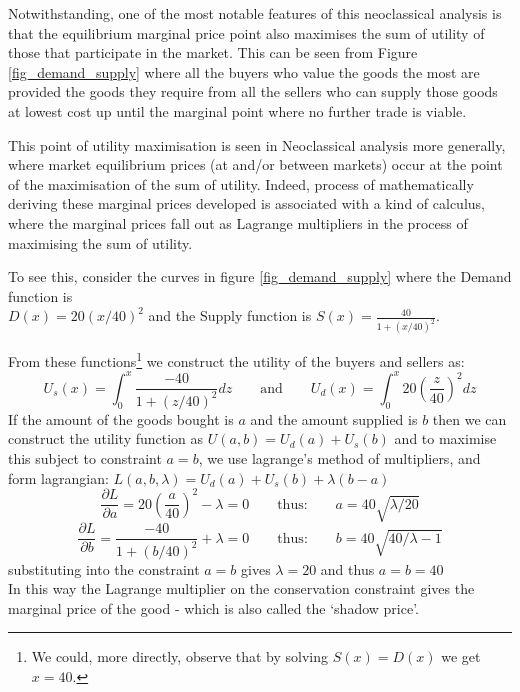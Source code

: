 

Notwithstanding, one of the most notable features of this neoclassical analysis is that the equilibrium marginal price point also maximises the sum of utility of those that participate in the market.
This can be seen from Figure \ref{fig_demand_supply} where all the buyers who value the goods the most are provided the goods they require from all the sellers who can supply those goods at lowest cost up until the marginal point where no further trade is viable.

This point of utility maximisation is seen in Neoclassical analysis more generally, where market equilibrium prices (at and/or between markets) occur at the point of the maximisation of the sum of utility.
Indeed, process of mathematically deriving these marginal prices developed is associated with a kind of calculus, where the marginal prices fall out as Lagrange multipliers in the process of maximising the sum of utility.

To see this, consider the curves in figure \ref{fig_demand_supply} where the Demand function is\\ $D(x) = 20(x/40)^2$ and the Supply function is $S(x) = \frac{40}{1+(x/40)^2}$.

From these functions\footnote{We could, more directly, observe that by solving $S(x)=D(x)$ we get $x=40$.} we construct the utility of the buyers and sellers as:
$$U_s(x) = \int_0^x\frac{-40}{1+(z/40)^2}dz \quad\quad\text{and}\quad\quad U_d(x) = \int_0^x20\left(\frac{z}{40}\right)^2dz$$
If the amount of the goods bought is $a$ and the amount supplied is $b$ then we can construct the utility function as $U(a,b) = U_d(a) + U_s(b)$
and to maximise this subject to constraint $a=b$, we use lagrange's method of multipliers, and form lagrangian:
$L(a,b,\lambda) = U_d(a) + U_s(b) + \lambda(b-a)$
$$\frac{\partial L}{\partial a} = 20\left(\frac{a}{40}\right)^2 - \lambda = 0 \quad\quad\text{thus:}\quad\quad a = 40\sqrt{\lambda/20}$$
$$\frac{\partial L}{\partial b} = \frac{-40}{1+(b/40)^2} + \lambda = 0 \quad\quad\text{thus:}\quad\quad b = 40\sqrt{40/\lambda - 1}$$
substituting into the constraint $a=b$ gives $\lambda=20$ and thus $a=b=40$\\
In this way the Lagrange multiplier on the conservation constraint gives the marginal price of the good - which is also called the `shadow price'.

